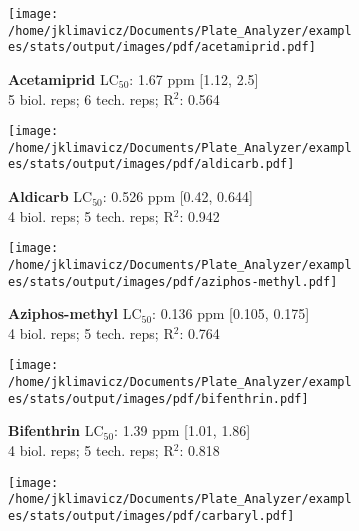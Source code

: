 \documentclass{article}
\author{James Klimavicz}
\date{\today}
\begin{document}
\begin{figure}[thp!]
   \begin{subfigure}{0.500\textwidth}
      \centering
      \texttt{[image: /home/jklimavicz/Documents/Plate\_Analyzer/examples/stats/output/images/pdf/acetamiprid.pdf]}
      \vspace{-0.05cm}
      \caption*{\textbf{Acetamiprid} LC$_{50}$: 1.67 ppm [1.12, 2.5] \\ 
5 biol. reps; 6 tech. reps; R$^2$: 0.564}
      \vspace{0.1cm}
   \end{subfigure}%
   \begin{subfigure}{0.500\textwidth}
      \centering
      \texttt{[image: /home/jklimavicz/Documents/Plate\_Analyzer/examples/stats/output/images/pdf/aldicarb.pdf]}
      \vspace{-0.05cm}
      \caption*{\textbf{Aldicarb} LC$_{50}$: 0.526 ppm [0.42, 0.644] \\ 
4 biol. reps; 5 tech. reps; R$^2$: 0.942}
      \vspace{0.1cm}
   \end{subfigure}%
\vspace{-0.1cm}
   \begin{subfigure}{0.500\textwidth}
      \centering
      \texttt{[image: /home/jklimavicz/Documents/Plate\_Analyzer/examples/stats/output/images/pdf/aziphos-methyl.pdf]}
      \vspace{-0.05cm}
      \caption*{\textbf{Aziphos-methyl} LC$_{50}$: 0.136 ppm [0.105, 0.175] \\ 
4 biol. reps; 5 tech. reps; R$^2$: 0.764}
      \vspace{0.1cm}
   \end{subfigure}%
   \begin{subfigure}{0.500\textwidth}
      \centering
      \texttt{[image: /home/jklimavicz/Documents/Plate\_Analyzer/examples/stats/output/images/pdf/bifenthrin.pdf]}
      \vspace{-0.05cm}
      \caption*{\textbf{Bifenthrin} LC$_{50}$: 1.39 ppm [1.01, 1.86] \\ 
4 biol. reps; 5 tech. reps; R$^2$: 0.818}
      \vspace{0.1cm}
   \end{subfigure}%
\vspace{-0.1cm}
   \begin{subfigure}{0.500\textwidth}
      \centering
      \texttt{[image: /home/jklimavicz/Documents/Plate\_Analyzer/examples/stats/output/images/pdf/carbaryl.pdf]}

\end{subfigure}
\end{figure}
\end{document}
